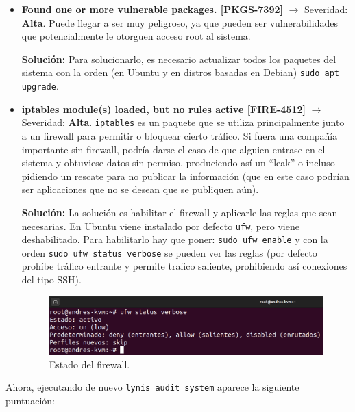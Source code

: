 \documentclass{article}
\begin{document}
\begin{itemize}
    \item \textbf{Found one or more vulnerable packages. [PKGS-7392]} $\rightarrow$ Severidad: \textbf{Alta}. Puede llegar a ser muy peligroso, ya que pueden ser vulnerabilidades que potencialmente le otorguen acceso root al sistema. 
    
    \textbf{Solución: }Para solucionarlo, es necesario actualizar todos los paquetes del sistema con la orden (en Ubuntu y en distros basadas en Debian) \verb|sudo apt upgrade|.


    \item \textbf{iptables module(s) loaded, but no rules active [FIRE-4512]} $\rightarrow$ Severidad: \textbf{Alta}. \verb|iptables| es un paquete que se utiliza principalmente junto a un firewall para permitir o bloquear cierto tráfico. Si fuera una compañía importante sin firewall, podría darse el caso de que alguien entrase en el sistema y obtuviese datos sin permiso, produciendo así un ``leak'' o incluso pidiendo un rescate para no publicar la información (que en este caso podrían ser aplicaciones que no se desean que se publiquen aún).
    
    \textbf{Solución: }La solución es habilitar el firewall y aplicarle las reglas que sean necesarias. En Ubuntu viene instalado por defecto \verb|ufw|, pero viene deshabilitado. Para habilitarlo hay que poner: \verb|sudo ufw enable| y con la orden \verb|sudo ufw status verbose| se pueden ver las reglas (por defecto prohíbe tráfico entrante y permite trafico saliente, prohibiendo así conexiones del tipo SSH).

    \begin{figure}[H]
        \includegraphics[width=\textwidth]{imagenes/ufwstatus.png}
        \caption{Estado del firewall.}
    \end{figure}
\end{itemize}

\bigskip

Ahora, ejecutando de nuevo \verb|lynis audit system| aparece la siguiente puntuación:
\end{document}
